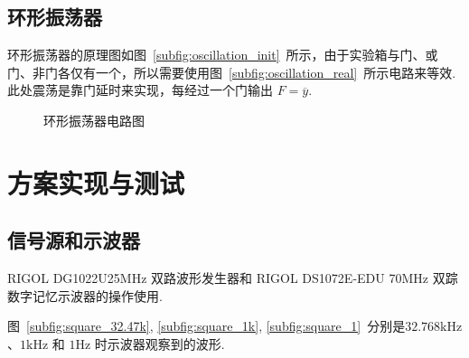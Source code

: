\documentclass[fontset=windows,11pt]{SEU-Digital-Report}
\begin{document}
        \subsection{环形振荡器}

            环形振荡器的原理图如图~\ref{subfig:oscillation_init}~所示，由于实验箱与门、或门、非门各仅有一个，所以需要使用图~\ref{subfig:oscillation_real}~所示电路来等效.
            此处震荡是靠门延时来实现，每经过一个门输出 $F=\overline{y}$.

            \begin{figure}[htbp]
                \centering
                \caption{环形振荡器电路图}
                \label{fig:oscillation_circuit}
            \end{figure}

            \vspace{-1cm}

    \section{方案实现与测试}

        \subsection{信号源和示波器}

            RIGOL DG1022U25MHz 双路波形发生器和 RIGOL DS1072E-EDU
            70MHz 双踪数字记忆示波器的操作使用.

            图~\ref{subfig:square_32.47k}, \ref{subfig:square_1k}, \ref{subfig:square_1}~分别是$32.768\mathrm{kHz}$、$1\mathrm{kHz}$ 和 $1\mathrm{Hz}$ 时示波器观察到的波形.
\end{document}
